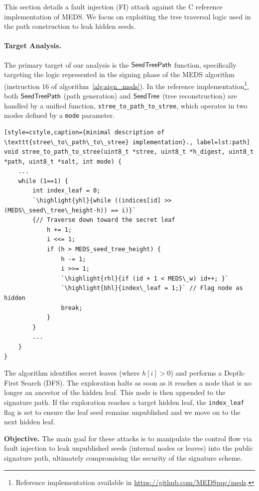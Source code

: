 This section details a fault injection (FI) attack against 
the C reference implementation of MEDS. We focus on 
exploiting the tree traversal logic used in the path construction to leak 
hidden seeds.

\paragraph{Target Analysis.}
The primary target of our analysis is the $\mathsf{SeedTreePath}$ function, 
specifically targeting the logic represented in the signing phase of 
the MEDS algorithm (instruction 16 of algorithm~\ref{alg:sign_meds}). 
In the reference implementation\footnote{Reference implementation 
available in \url{https://github.com/MEDSpqc/meds}.}, both $\mathsf{SeedTreePath}$ 
(path generation) and $\mathsf{SeedTree}$ (tree reconstruction) are handled by a unified function, 
\texttt{stree\_to\_path\_to\_stree}, which operates in two modes defined 
by a \texttt{mode} parameter.

\begin{lstlisting}[style=cstyle,caption={minimal description of \texttt{stree\_to\_path\_to\_stree} implementation}., label=lst:path]
void stree_to_path_to_stree(uint8_t *stree, uint8_t *h_digest, uint8_t *path, uint8_t *salt, int mode) {
    ...
    while (1==1) {
        int index_leaf = 0;
        `\highlight{yhl}{while ((indices[id] >> (MEDS\_seed\_tree\_height-h)) == i)}` 
        {// Traverse down toward the secret leaf
            h += 1;
            i <<= 1;
            if (h > MEDS_seed_tree_height) {
                h -= 1;
                i >>= 1;
                `\highlight{rhl}{if (id + 1 < MEDS\_w) id++; }`
                `\highlight{bhl}{index\_leaf = 1;}` // Flag node as hidden
                break;
            }
        }
        ...
    }
}
\end{lstlisting}

The algorithm identifies secret leaves (where $h[i] > 0$) and performs a Depth-First Search (DFS). The exploration halts as soon as it reaches a node that is no longer an ancestor of the hidden leaf. This node is then appended to the signature path. If the exploration reaches a target hidden leaf, the \texttt{index\_leaf} flag is set to ensure the leaf seed remains unpublished and we move on to the next hidden leaf.

\noindent\textbf{Objective.}
The main goal for these attacks is to manipulate the control flow 
via fault injection to leak unpublished seeds (internal nodes or leaves) 
into the public signature path, ultimately compromising the security 
of the signature scheme.


